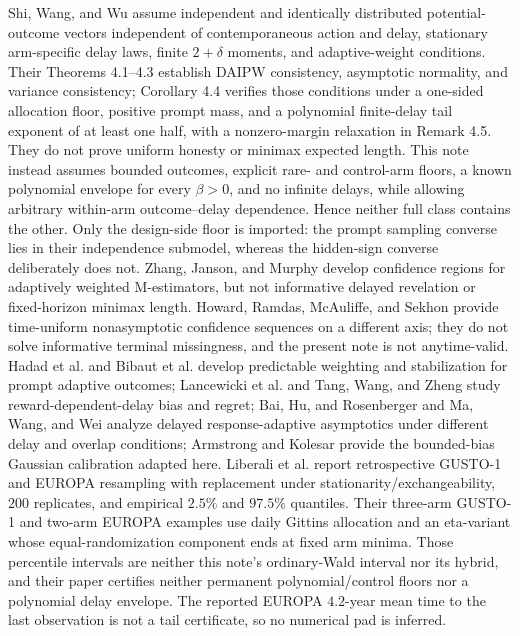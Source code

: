 \documentclass{article}
\begin{document}
Shi, Wang, and Wu \cite{ShiWangWu2023DelayedInference} assume independent and identically distributed potential-outcome vectors independent of contemporaneous action and delay, stationary arm-specific delay laws, finite \(2+\delta\) moments, and adaptive-weight conditions. Their Theorems 4.1--4.3 establish DAIPW consistency, asymptotic normality, and variance consistency; Corollary 4.4 verifies those conditions under a one-sided allocation floor, positive prompt mass, and a polynomial finite-delay tail exponent of at least one half, with a nonzero-margin relaxation in Remark 4.5. They do not prove uniform honesty or minimax expected length. This note instead assumes bounded outcomes, explicit rare- and control-arm floors, a known polynomial envelope for every \(\beta>0\), and no infinite delays, while allowing arbitrary within-arm outcome--delay dependence. Hence neither full class contains the other. Only the design-side floor is imported: the prompt sampling converse lies in their independence submodel, whereas the hidden-sign converse deliberately does not. Zhang, Janson, and Murphy \cite{ZhangJansonMurphy2021MEstimators} develop confidence regions for adaptively weighted M-estimators, but not informative delayed revelation or fixed-horizon minimax length. Howard, Ramdas, McAuliffe, and Sekhon \cite{HowardRamdasMcAuliffeSekhon2021} provide time-uniform nonasymptotic confidence sequences on a different axis; they do not solve informative terminal missingness, and the present note is not anytime-valid. Hadad et al. and Bibaut et al. develop predictable weighting and stabilization for prompt adaptive outcomes; Lancewicki et al. and Tang, Wang, and Zheng study reward-dependent-delay bias and regret; Bai, Hu, and Rosenberger and Ma, Wang, and Wei analyze delayed response-adaptive asymptotics under different delay and overlap conditions; Armstrong and Kolesar provide the bounded-bias Gaussian calibration adapted here. Liberali et al. \cite{LiberaliEtAl2025RTAR} report retrospective GUSTO-1 and EUROPA resampling with replacement under stationarity/exchangeability, \(200\) replicates, and empirical \(2.5\%\) and \(97.5\%\) quantiles. Their three-arm GUSTO-1 and two-arm EUROPA examples use daily Gittins allocation and an eta-variant whose equal-randomization component ends at fixed arm minima. Those percentile intervals are neither this note's ordinary-Wald interval nor its hybrid, and their paper certifies neither permanent polynomial/control floors nor a polynomial delay envelope. The reported EUROPA \(4.2\)-year mean time to the last observation is not a tail certificate, so no numerical pad is inferred.
\end{document}
